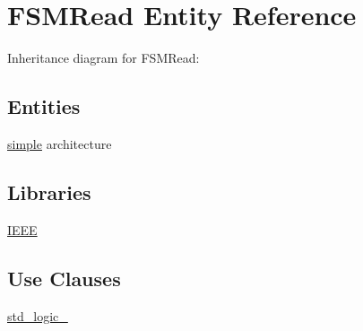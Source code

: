 \hypertarget{class_f_s_m_read}{}\section{F\+S\+M\+Read Entity Reference}
\label{class_f_s_m_read}


Inheritance diagram for F\+S\+M\+Read\+:
\subsection*{Entities}
\begin{DoxyCompactItemize}
\item 
\hyperlink{class_f_s_m_read_1_1simple}{simple} architecture
\end{DoxyCompactItemize}
\subsection*{Libraries}
 \begin{DoxyCompactItemize}
\item 
\hyperlink{class_f_s_m_read_ae4f03c286607f3181e16b9aa12d0c6d4}{I\+E\+E\+E} 
\end{DoxyCompactItemize}
\subsection*{Use Clauses}
 \begin{DoxyCompactItemize}
\item 
\hyperlink{class_f_s_m_read_acd03516902501cd1c7296a98e22c6fcb}{std\+\_\+logic\+\_}   
\end{DoxyCompactItemize}
